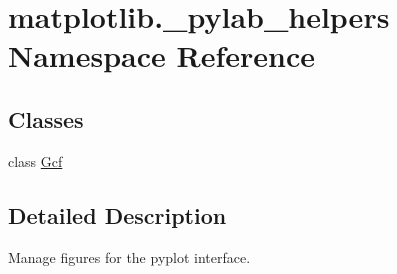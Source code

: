 \hypertarget{namespacematplotlib_1_1__pylab__helpers}{}\section{matplotlib.\+\_\+pylab\+\_\+helpers Namespace Reference}
\label{namespacematplotlib_1_1__pylab__helpers}
\subsection*{Classes}
\begin{DoxyCompactItemize}
\item 
class \hyperlink{classmatplotlib_1_1__pylab__helpers_1_1Gcf}{Gcf}
\end{DoxyCompactItemize}


\subsection{Detailed Description}
\begin{DoxyVerb}Manage figures for the pyplot interface.
\end{DoxyVerb}
 